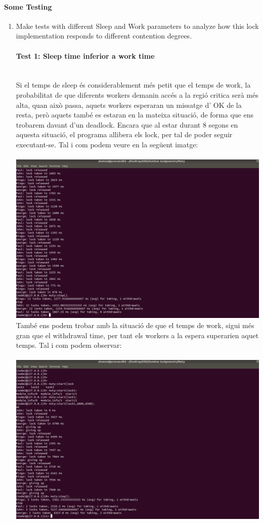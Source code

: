 \documentclass[a4paper, 10pt]{article}
\begin{document}
\paragraph[bold]{Some Testing}
\begin{enumerate}
\item Make tests with different Sleep and Work parameters to analyze how this lock implementation responds to different contention degrees.
\paragraph[bold]{Test 1: Sleep time inferior a work time\\\\}
Si el temps de sleep és considerablement més petit que el temps de work, la probabilitat de que diferents workers demanin accés a la regió critica serà més alta, quan això passa, aquets workers esperaran un missatge d' OK de la resta, però aquets també es estaran en la mateixa situació, de forma que ens trobarem davant d'un deadlock. Encara que al estar durant 8 segons en aquesta situació, el programa allibera els lock, per tal de poder seguir executant-se. Tal i com podem veure en la següent imatge:\\\\
\includegraphics[width=\textwidth]{test-1}
\newpage També ens podem trobar amb la situació de que el temps de work, sigui més gran que el withdrawal time, per tant els workers a la espera superarien aquet temps. Tal i com podem observar:\\\\
\includegraphics[width=\textwidth]{test-2}

\end{enumerate}
\end{document}
